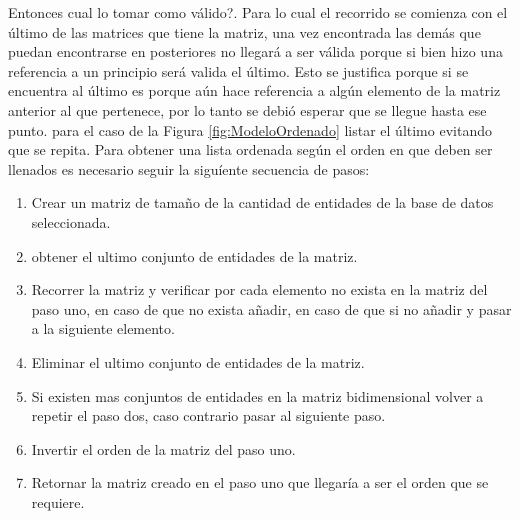 Entonces cual lo tomar como v\'alido?.
Para lo cual el  recorrido se comienza con el \'ultimo de las matrices que tiene la matriz, una vez encontrada las dem\'as que puedan encontrarse en posteriores no llegar\'a a ser v\'alida porque si bien hizo una referencia a un principio ser\'a valida el \'ultimo. Esto se justifica porque si se encuentra al \'ultimo es porque a\'un hace referencia a alg\'un elemento de la matriz anterior al que pertenece, por lo tanto se debi\'o esperar que se llegue hasta ese punto. para el caso de la Figura \ref{fig:ModeloOrdenado} listar el \'ultimo evitando que se repita.
Para obtener una lista ordenada seg\'un el orden en que deben ser llenados es necesario seguir la sigu\'iente secuencia de pasos:
\begin{enumerate}
\item Crear un matriz de tama\~no de la cantidad de entidades de la base de datos seleccionada.
\item obtener el ultimo conjunto de entidades de la matriz.
\item Recorrer la matriz y verificar por cada elemento no exista en la matriz del paso uno, en caso de que no exista a\~nadir, en caso de que si no a\~nadir y pasar a la siguiente elemento.
\item Eliminar el ultimo conjunto de entidades de la matriz.
\item Si existen mas conjuntos de entidades en la matriz bidimensional volver a repetir el paso dos, caso contrario pasar al siguiente paso.
\item Invertir el orden de la matriz del paso uno.
\item Retornar la matriz creado en el paso uno que llegar\'ia a ser el orden que se requiere.
\end{enumerate}
